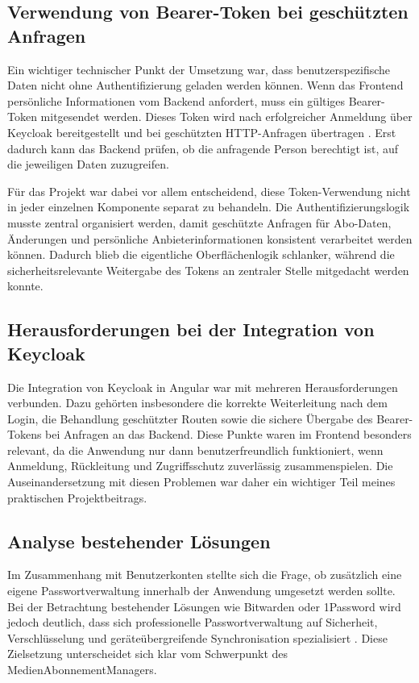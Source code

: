 \subsection{Verwendung von Bearer-Token bei geschützten Anfragen}
Ein wichtiger technischer Punkt der Umsetzung war, dass benutzerspezifische Daten nicht ohne Authentifizierung geladen werden können. Wenn das Frontend persönliche Informationen vom Backend anfordert, muss ein gültiges Bearer-Token mitgesendet werden. Dieses Token wird nach erfolgreicher Anmeldung über Keycloak bereitgestellt und bei geschützten HTTP-Anfragen übertragen \cite{keycloak_docs}. Erst dadurch kann das Backend prüfen, ob die anfragende Person berechtigt ist, auf die jeweiligen Daten zuzugreifen.

Für das Projekt war dabei vor allem entscheidend, diese Token-Verwendung nicht in jeder einzelnen Komponente separat zu behandeln. Die Authentifizierungslogik musste zentral organisiert werden, damit geschützte Anfragen für Abo-Daten, Änderungen und persönliche Anbieterinformationen konsistent verarbeitet werden können. Dadurch blieb die eigentliche Oberflächenlogik schlanker, während die sicherheitsrelevante Weitergabe des Tokens an zentraler Stelle mitgedacht werden konnte.

\subsection{Herausforderungen bei der Integration von Keycloak}
Die Integration von Keycloak in Angular war mit mehreren Herausforderungen verbunden. Dazu gehörten insbesondere die korrekte Weiterleitung nach dem Login, die Behandlung geschützter Routen sowie die sichere Übergabe des Bearer-Tokens bei Anfragen an das Backend. Diese Punkte waren im Frontend besonders relevant, da die Anwendung nur dann benutzerfreundlich funktioniert, wenn Anmeldung, Rückleitung und Zugriffsschutz zuverlässig zusammenspielen. Die Auseinandersetzung mit diesen Problemen war daher ein wichtiger Teil meines praktischen Projektbeitrags.

\subsection{Analyse bestehender Lösungen}
Im Zusammenhang mit Benutzerkonten stellte sich die Frage, ob zusätzlich eine eigene Passwortverwaltung innerhalb der Anwendung umgesetzt werden sollte. Bei der Betrachtung bestehender Lösungen wie Bitwarden oder 1Password wird jedoch deutlich, dass sich professionelle Passwortverwaltung auf Sicherheit, Verschlüsselung und geräteübergreifende Synchronisation spezialisiert \cite{keycloak_home}. Diese Zielsetzung unterscheidet sich klar vom Schwerpunkt des MedienAbonnementManagers.

